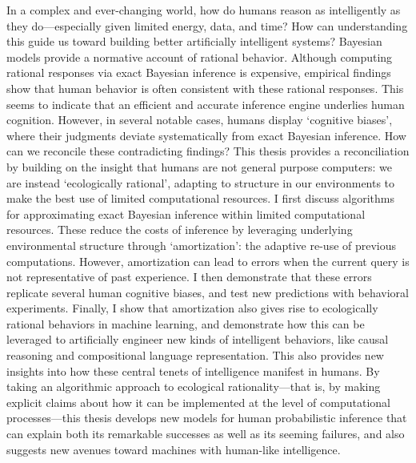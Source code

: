 

In a complex and ever-changing world, how do humans reason as intelligently as they do---especially given limited energy, data, and time?
How can understanding this guide us toward building better artificially intelligent systems?
Bayesian models provide a normative account of rational behavior. Although computing rational responses via exact Bayesian inference is expensive, empirical findings show that human behavior is often consistent with these rational responses. 
This seems to indicate that an efficient and accurate inference engine underlies human cognition. 
However, in several notable cases, humans display `cognitive biases', where their judgments deviate systematically from exact Bayesian inference. 
How can we reconcile these contradicting findings? 
This thesis provides a reconciliation by building on the insight that humans are not general purpose computers: we are instead `ecologically rational', adapting to structure in our environments to make the best use of limited computational resources. 
I first discuss %
algorithms for approximating exact Bayesian inference within limited computational resources. 
These reduce the costs of inference by leveraging underlying environmental structure through `amortization': the adaptive re-use of previous computations. 
However, amortization can lead to errors when the current query is not representative of past experience. 
I then demonstrate that these errors replicate several human cognitive biases, and test new predictions with behavioral experiments. 
Finally, I show that amortization also gives rise to ecologically rational behaviors in machine learning, and demonstrate how this can be leveraged to artificially engineer new kinds of intelligent behaviors, like causal reasoning and compositional language representation. 
This also provides new insights into how these central tenets of intelligence manifest in humans. 
By taking an algorithmic approach to ecological rationality---that is, by making explicit claims about how it can be implemented at the level of computational processes---this thesis develops new models for human probabilistic inference that can explain both its remarkable successes as well as its seeming failures, and also suggests new avenues toward machines with human-like intelligence.